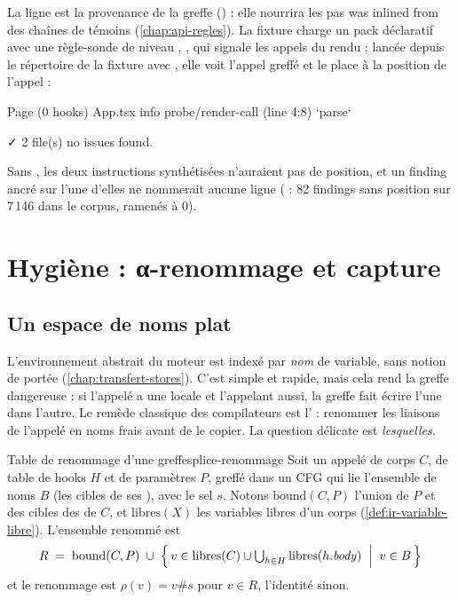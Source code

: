 La ligne  est la provenance de la greffe () : elle nourrira les pas \og was inlined from\fg{} des chaînes de témoins (\cref{chap:api-regles}). La fixture charge un pack déclaratif avec une règle-sonde de niveau \Info{}, , qui signale les appels du rendu ; lancée depuis le répertoire de la fixture avec , elle voit l'appel greffé  et le place à la position de l'appel :

\begin{sortie}
  Page  (0 hooks)  App.tsx
    info   probe/render-call  (line 4:8)  `parse`

✓  2 file(s) no issues found.
\end{sortie}

Sans , les deux instructions synthétisées n'auraient pas de position, et un finding ancré sur l'une d'elles ne nommerait aucune ligne ( : 82 findings sans position sur 7\,146 dans le corpus, ramenés à 0).

\section{Hygiène : α-renommage et capture}
\label{sec:splice-hygiene}

\subsection{Un espace de noms plat}

L'environnement abstrait du moteur est indexé par \emph{nom} de variable, sans notion de portée (\cref{chap:transfert-stores}). C'est simple et rapide, mais cela rend la greffe dangereuse : si l'appelé a une locale  et l'appelant aussi, la greffe fait écrire l'une dans l'autre. Le remède classique des compilateurs est l' : renommer les liaisons de l'appelé en noms frais avant de le copier. La question délicate est \emph{lesquelles}.

\begin{definition}{Table de renommage d'une greffe}{splice-renommage}
Soit un appelé de corps $C$, de table de hooks $H$ et de paramètres $P$, greffé dans un CFG qui lie l'ensemble de noms $B$ (les cibles de ses ), avec le sel $s$. Notons $(C, P)$ l'union de $P$ et des cibles des  de $C$, et $(X)$ les variables libres d'un corps (\cref{def:ir-variable-libre}). L'ensemble renommé est
\[
R \;=\; \mathrm{bound}(C, P) \;\cup\; \Bigl\{\, v \in \mathrm{libres}(C) \cup \textstyle\bigcup_{h \in H} \mathrm{libres}(h.\mathit{body}) \;\Bigm|\; v \in B \,\Bigr\}
\]
et le renommage est $\rho(v) = v\#s$ pour $v \in R$, l'identité sinon.
\end{definition}

